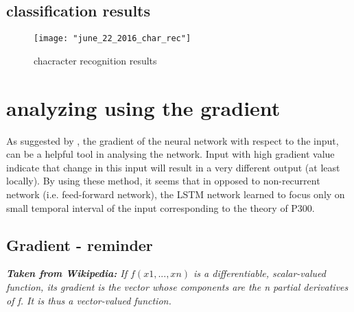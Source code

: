 \documentclass[]{report}
\begin{document}
\subsection{classification results}

%
%


\begin{figure*}[h]
	\texttt{[image: "june\_22\_2016\_char\_rec"]}
	\caption{chacracter recognition results}
	\label{fig:cahracter_rec}
\end{figure*}




\section{analyzing using the gradient}
As suggested by \cite{AlexGraveBook}, the gradient of the neural network with respect to the input, can be a helpful tool in analysing the network. Input with high gradient value indicate that change in this input will result in a very different output (at least locally). By using these method, it seems that in opposed to non-recurrent network (i.e. feed-forward network), the LSTM network learned to focus only on small temporal interval of the input corresponding to the theory of P300. 


\subsection{Gradient - reminder}
\textit{\textbf{Taken from Wikipedia: } If $f(x1, ..., xn)$ is a differentiable, scalar-valued function, its gradient is the vector whose components are the n partial derivatives of f. It is thus a vector-valued function.}
\end{document}
